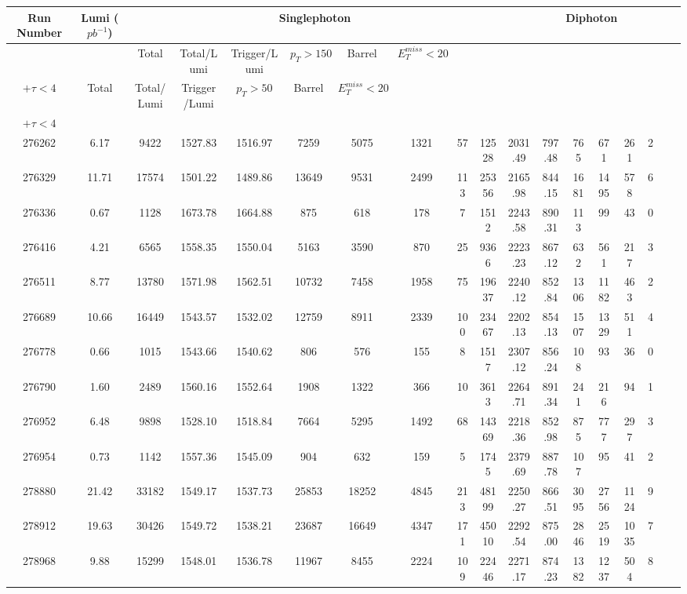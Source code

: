 \documentclass[10pt]{extarticle}
\begin{document}
\begin{longtable}{|c|c|c|c|c|c|c|c|c|c|c|c|c|c|c|c|c|c|}
\hline 
Run Number & Lumi ($pb^{-1}$) & \multicolumn{8}{|c|}{Singlephoton} & \multicolumn{8}{|c|}{Diphoton} \\ 
\hline 
 & & Total & Total/Lumi & Trigger/Lumi & $p_{T} > 150$ & Barrel & $E_{T}^{miss} < 20$ & \begin{tabular}{@{}c@{}} $E_{T}^{miss} > 75$ \\ $+ \tau < 4$ \end{tabular} & Total & Total/Lumi & Trigger/Lumi & $p_{T} > 50$ & Barrel & $E_{T}^{miss} < 20$ & \begin{tabular}{@{}c@{}} $E_{T}^{miss} > 75$ \\ $+ \tau < 4$ \end{tabular} \\ 
\hline 
276262&6.17&9422&1527.83&1516.97&7259&5075&1321&57&12528&2031.49&797.48&765&671&261&2 \\ 
\hline 
276329&11.71&17574&1501.22&1489.86&13649&9531&2499&113&25356&2165.98&844.15&1681&1495&578&6 \\ 
\hline 
276336&0.67&1128&1673.78&1664.88&875&618&178&7&1512&2243.58&890.31&113&99&43&0 \\ 
\hline 
276416&4.21&6565&1558.35&1550.04&5163&3590&870&25&9366&2223.23&867.12&632&561&217&3 \\ 
\hline 
276511&8.77&13780&1571.98&1562.51&10732&7458&1958&75&19637&2240.12&852.84&1306&1182&463&2 \\ 
\hline 
276689&10.66&16449&1543.57&1532.02&12759&8911&2339&100&23467&2202.13&854.13&1507&1329&511&4 \\ 
\hline 
276778&0.66&1015&1543.66&1540.62&806&576&155&8&1517&2307.12&856.24&108&93&36&0 \\ 
\hline 
276790&1.60&2489&1560.16&1552.64&1908&1322&366&10&3613&2264.71&891.34&241&216&94&1 \\ 
\hline 
276952&6.48&9898&1528.10&1518.84&7664&5295&1492&68&14369&2218.36&852.98&875&777&297&3 \\ 
\hline 
276954&0.73&1142&1557.36&1545.09&904&632&159&5&1745&2379.69&887.78&107&95&41&2 \\ 
\hline 
278880&21.42&33182&1549.17&1537.73&25853&18252&4845&213&48199&2250.27&866.51&3095&2756&1124&9 \\ 
\hline 
278912&19.63&30426&1549.72&1538.21&23687&16649&4347&171&45010&2292.54&875.00&2846&2519&1035&7 \\ 
\hline 
278968&9.88&15299&1548.01&1536.78&11967&8455&2224&109&22446&2271.17&874.23&1382&1237&504&8 \\ 

\end{longtable}
\end{document}
